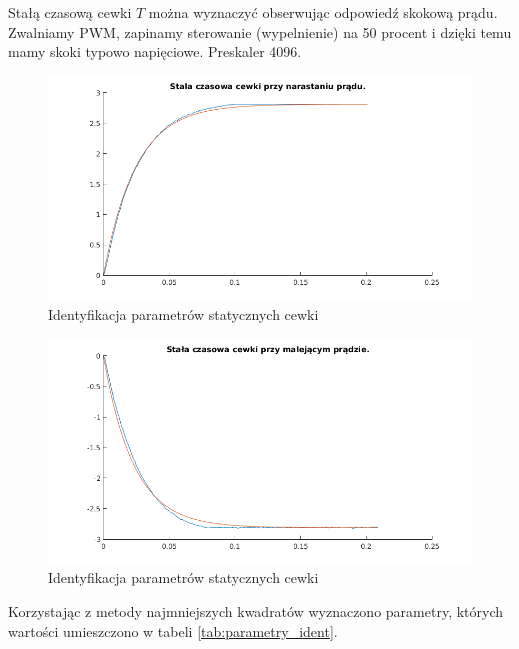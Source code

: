 Stałą czasową cewki $T$ można wyznaczyć obserwując odpowiedź skokową prądu.
Zwalniamy PWM, zapinamy sterowanie (wypelnienie) na 50 procent i dzięki temu mamy skoki typowo napięciowe. Preskaler 4096.

\begin{figure}[H]
\centering
\includegraphics[scale=0.85]{img/identyfikacja_stala_narastanie_0245.png}
\caption{Identyfikacja parametrów statycznych cewki}
\label{rys:cewka_k_uc}
\end{figure}

\begin{figure}[H]
\centering
\includegraphics[scale=0.85]{img/identyfikacja_stala_opadanie_0230.png}
\caption{Identyfikacja parametrów statycznych cewki}
\label{rys:cewka_k_uc}
\end{figure}



Korzystając z metody najmniejszych kwadratów wyznaczono parametry, których wartości umieszczono w tabeli  \ref{tab:parametry_ident}.



